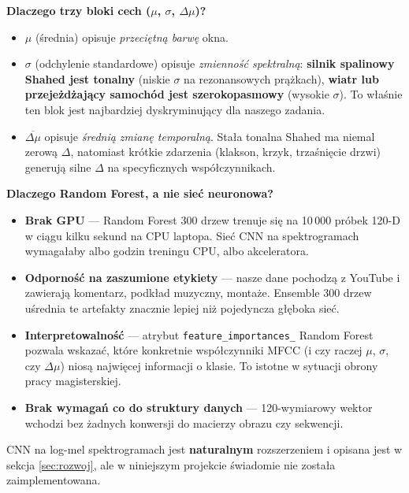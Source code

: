 \documentclass[11pt,a4paper]{article}
\newcommand{\sectionref}[1]{sekcja \ref{#1}}
\begin{document}
\textbf{Dlaczego trzy bloki cech ($\mu$, $\sigma$, $\Delta\mu$)?}
\begin{itemize}[noitemsep]
  \item $\mu$ (średnia) opisuje \emph{przeciętną barwę} okna.
  \item $\sigma$ (odchylenie standardowe) opisuje \emph{zmienność spektralną}:
        \textbf{silnik spalinowy Shahed jest tonalny} (niskie $\sigma$ na
        rezonansowych prążkach), \textbf{wiatr lub przejeżdżający samochód jest
        szerokopasmowy} (wysokie $\sigma$). To właśnie ten blok jest
        najbardziej dyskryminujący dla naszego zadania.
  \item $\overline{\Delta\mu}$ opisuje \emph{średnią zmianę temporalną}.
        Stała tonalna Shahed ma niemal zerową $\Delta$, natomiast krótkie
        zdarzenia (klakson, krzyk, trzaśnięcie drzwi) generują silne
        $\Delta$ na specyficznych współczynnikach.
\end{itemize}

\textbf{Dlaczego Random Forest, a nie sieć neuronowa?}
\begin{itemize}[noitemsep]
  \item \textbf{Brak GPU} --- Random Forest 300 drzew trenuje się na 10\,000
        próbek 120-D w ciągu kilku sekund na CPU laptopa. Sieć CNN na
        spektrogramach wymagałaby albo godzin treningu CPU, albo
        akceleratora.
  \item \textbf{Odporność na zaszumione etykiety} --- nasze dane pochodzą z
        YouTube i zawierają komentarz, podkład muzyczny, montaże. Ensemble
        300 drzew uśrednia te artefakty znacznie lepiej niż pojedyncza
        głęboka sieć.
  \item \textbf{Interpretowalność} --- atrybut \texttt{feature\_importances\_}
        Random Forest pozwala wskazać, które konkretnie współczynniki MFCC
        (i czy raczej $\mu$, $\sigma$, czy $\Delta\mu$) niosą najwięcej
        informacji o klasie. To istotne w sytuacji obrony pracy magisterskiej.
  \item \textbf{Brak wymagań co do struktury danych} --- 120-wymiarowy wektor
        wchodzi bez żadnych konwersji do macierzy obrazu czy sekwencji.
\end{itemize}

CNN na log-mel spektrogramach jest \textbf{naturalnym} rozszerzeniem i opisana
jest w \sectionref{sec:rozwoj}, ale w niniejszym projekcie świadomie nie została
zaimplementowana.

\end{document}
